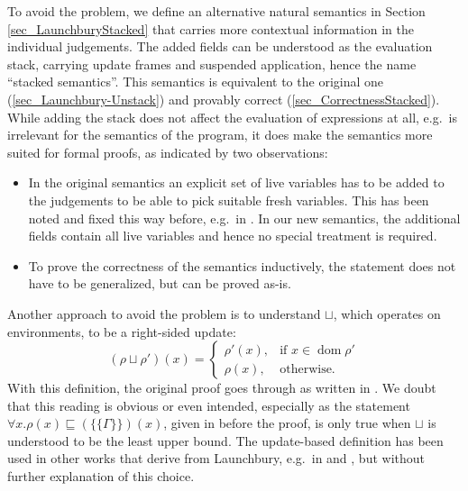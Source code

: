 \documentclass[11pt,a4paper,parskip=half]{scrartcl}
\begin{document}
To avoid the problem, we define an alternative natural semantics in Section \ref{sec_LaunchburyStacked} that carries more contextual information in the individual judgements. The added fields can be understood as the evaluation stack, carrying update frames and suspended application, hence the name “stacked semantics”.
This semantics is equivalent to the original one (\ref{sec_Launchbury-Unstack}) and provably correct (\ref{sec_CorrectnessStacked}).
While adding the stack does not affect the evaluation of expressions at all, e.g.\ is irrelevant for the semantics of the program, it does make the semantics more suited for formal proofs, as indicated by two observations:
\begin{itemize}
\item In the original semantics an explicit set of live variables has to be added to the judgements to be able to pick suitable fresh variables. This has been noted and fixed this way before, e.g.\ in \cite{sestoft}. In our new semantics, the additional fields contain all live variables and hence no special treatment is required.
\item To prove the correctness of the semantics inductively, the statement does not have to be generalized, but can be proved as-is.
\end{itemize}

Another approach to avoid the problem is to understand $\sqcup$, which operates on environments, to be a right-sided update:
\[
(\rho \sqcup \rho')(x) = 
\begin{cases}
\rho'(x), &\text{if } x \in \operatorname{dom} \rho' \\
\rho(x), &\text{otherwise.}
\end{cases}
\]
With this definition, the original proof goes through as written in \cite{launchbury}. We doubt that this reading is obvious or even intended, especially as the statement $\forall x. \rho(x) \sqsubseteq (\{\!\!\{\Gamma\}\!\!\})(x)$, given in \cite{launchbury} before the proof, is only true when $\sqcup$ is understood to be the least upper bound. The update-based definition has been used in other works that derive from Launchbury, e.g.\ in \cite{parallel} and \cite{nakata_blackhole}, but without further explanation of this choice.
\end{document}
